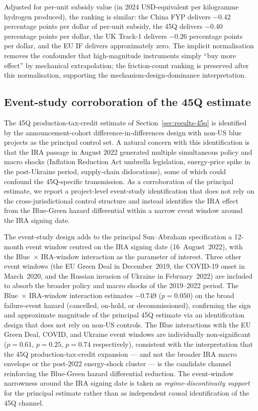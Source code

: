 \documentclass[12pt,a4paper]{article}
\theoremstyle{plain}
\theoremstyle{definition}
\begin{document}
Adjusted for per-unit subsidy value (in 2024 USD-equivalent per kilogramme hydrogen produced), the ranking is similar: the China FYP delivers $-0.42$ percentage points per dollar of per-unit subsidy, the 45Q delivers $-0.40$ percentage points per dollar, the UK Track-1 delivers $-0.26$ percentage points per dollar, and the EU IF delivers approximately zero. The implicit normalisation removes the confounder that high-magnitude instruments simply ``buy more effect'' by mechanical extrapolation; the friction-count ranking is preserved after this normalisation, supporting the mechanism-design-dominance interpretation.

\subsection{Event-study corroboration of the 45Q estimate}
\label{sec:results-event-study-corroboration}

The 45Q production-tax-credit estimate of Section~\ref{sec:results-45q} is identified by the announcement-cohort difference-in-differences design with non-US blue projects as the principal control set. A natural concern with this identification is that the IRA passage in August 2022 generated multiple simultaneous policy and macro shocks (Inflation Reduction Act umbrella legislation, energy-price spike in the post-Ukraine period, supply-chain dislocations), some of which could confound the 45Q-specific transmission. As a corroboration of the principal estimate, we report a project-level event-study identification that does not rely on the cross-jurisdictional control structure and instead identifies the IRA effect from the Blue-Green hazard differential within a narrow event window around the IRA signing date.

The event-study design adds to the principal Sun--Abraham specification a 12-month event window centred on the IRA signing date (16~August~2022), with the Blue~$\times$ IRA-window interaction as the parameter of interest. Three other event windows (the EU Green Deal in December~2019, the COVID-19 onset in March~2020, and the Russian invasion of Ukraine in February~2022) are included to absorb the broader policy and macro shocks of the 2019--2022 period. The Blue~$\times$ IRA-window interaction estimates $-0.749$ ($p = 0.050$) on the broad failure-event hazard (cancelled, on-hold, or decommissioned), confirming the sign and approximate magnitude of the principal 45Q estimate via an identification design that does not rely on non-US controls. The Blue interactions with the EU Green Deal, COVID, and Ukraine event windows are individually non-significant ($p = 0.61$, $p = 0.25$, $p = 0.74$ respectively), consistent with the interpretation that the 45Q production-tax-credit expansion --- and not the broader IRA macro envelope or the post-2022 energy-shock cluster --- is the candidate channel reinforcing the Blue-Green hazard differential reduction. The event-window narrowness around the IRA signing date is taken as \emph{regime-discontinuity support} for the principal estimate rather than as independent causal identification of the 45Q channel.
\end{document}
